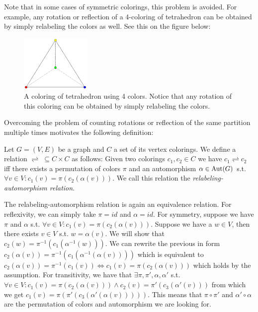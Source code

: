 \begin{highlight}
Note that in some cases of symmetric colorings, this problem is avoided. For example, any rotation or reflection of a 4-coloring of tetrahedron can be obtained by simply relabeling the colors as well. See this on the figure below:

\begin{figure}[H]
    \centering
    \includegraphics[width=0.3\textwidth]{Resources/Figs/example-tetrahedron-4-clring.pdf}
    \caption{A coloring of tetrahedron using 4 colors. Notice that any rotation of this coloring can be obtained by simply relabeling the colors.}
    \label{fig:example-tetrahedron-4-coloring}
\end{figure}

Overcoming the problem of counting rotations or reflection of the same partition multiple times motivates the following definition:

\begin{defn}
    Let $G=(V,E)$ be a graph and $C$ a set of its vertex colorings. We define a relation $\rightleftharpoons \; \subseteq C \times C$ as follows: Given two colorings $c_1,c_2 \in C$ we have $c_1 \rightleftharpoons c_2$ iff there exists a permutation of colors $\pi$ and an automorphism $\alpha \in \operatorname{Aut}(G)$ s.t. $\forall v \in V : c_1(v) = \pi(c_2(\alpha(v)))$. We call this relation the \emph{relabeling-automorphism relation}.
\end{defn}

The relabeling-automorphism relation is again an equivalence relation. For reflexivity, we can simply take $\pi = id$ and $\alpha = id$. For symmetry, suppose we have $\pi$ and $\alpha$ s.t. $\forall v \in V : c_1(v) = \pi(c_2(\alpha(v)))$. Suppose we have a $w \in V$, then there exists $v \in V$ s.t. $w = \alpha(v)$. We will show that $c_2(w) = \pi^{-1}(c_1(\alpha^{-1}(w)))$. We can rewrite the previous in form $c_2(\alpha(v)) = \pi^{-1}(c_1(\alpha^{-1}(\alpha(v))))$ which is equivalent to $c_2(\alpha(v)) = \pi^{-1}(c_1(v)) \iff c_1(v) = \pi(c_2(\alpha(v)))$ which holds by the assumption. For transitivity, we have that $\exists \pi, \pi', \alpha ,\alpha'$ s.t. $\forall v \in V : c_1(v) = \pi(c_2(\alpha(v))) \wedge c_2(v) = \pi'(c_3(\alpha'(v)))$ from which we get $c_1(v)=\pi(\pi'(c_3(\alpha'(\alpha(v)))))$. This means that $\pi \circ \pi'$ and $\alpha' \circ \alpha$ are the permutation of colors and automorphism we are looking for.


\end{highlight}
